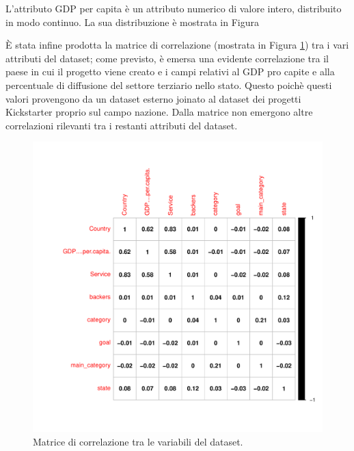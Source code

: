 L'attributo GDP per capita è un attributo numerico di valore intero, distribuito in modo continuo. La sua distribuzione è mostrata in Figura 

È stata infine prodotta la matrice di correlazione (mostrata in Figura \ref{fig:corrplot}) tra i vari attributi del dataset; come previsto, è emersa una evidente correlazione tra il paese in cui il progetto viene creato e i campi relativi al GDP pro capite e alla percentuale di diffusione del settore terziario nello stato. Questo poichè questi valori provengono da un dataset esterno joinato al dataset dei progetti Kickstarter proprio sul campo nazione. Dalla matrice non emergono altre correlazioni rilevanti tra i restanti attributi del dataset.

\begin{figure}
	\centering
	\includegraphics[width=1\linewidth]{../FinalResults/Images/Data_exploration_plots/corrplot}
	\caption{Matrice di correlazione tra le variabili del dataset.}
	\label{fig:corrplot}
\end{figure}


